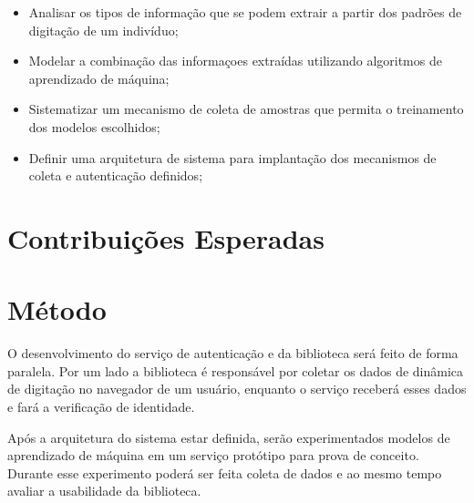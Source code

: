 \documentclass[pfc]{imetex}
\begin{document}
\begin{itemize}
\item Analisar os tipos de informação que se podem extrair a partir dos padrões de digitação de um indivíduo;
\item Modelar a combinação das informaçoes extraídas utilizando algoritmos de aprendizado de máquina;
\item Sistematizar um mecanismo de coleta de amostras que permita o treinamento dos modelos escolhidos;
\item Definir uma arquitetura de sistema para implantação dos mecanismos de coleta e autenticação definidos;
\end{itemize}

\section{Contribuições Esperadas}

\section{Método}
O desenvolvimento do serviço de autenticação e da biblioteca será feito de forma paralela. Por um lado a biblioteca é responsável por coletar os dados de dinâmica de digitação no navegador de um usuário, enquanto o serviço receberá esses dados e fará a verificação de identidade.

Após a arquitetura do sistema estar definida, serão experimentados modelos de aprendizado de máquina em um serviço protótipo para prova de conceito. Durante esse experimento poderá ser feita coleta de dados e ao mesmo tempo avaliar a usabilidade da biblioteca.
\end{document}
